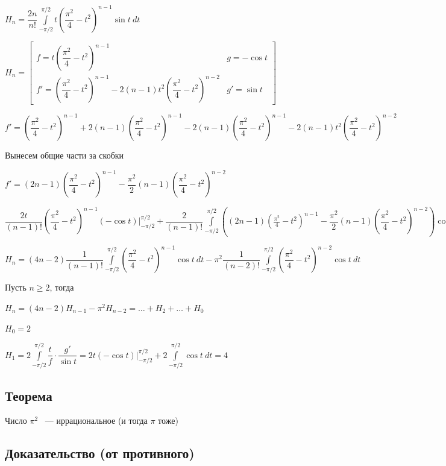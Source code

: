 \documentclass{article}
\begin{document}
			$H_n = \dfrac{2n}{n!} \int\limits^{\pi / 2}_{-\pi / 2} t \left(\dfrac{\pi^2}{4}-t^2 \right)^{n - 1} \sin t \ dt$
			
			$H_n = \begin{bmatrix} f = t \left(\dfrac{\pi^2}{4} - t^2\right)^{n - 1} & g = -\cos t \\ f' = \left(\dfrac{\pi^2}{4} - t^2\right)^{n - 1} - 2(n - 1)t^2\left(\dfrac{\pi^2}{4} - t^2\right)^{n - 2} & g' = \sin t \end{bmatrix}$
			
			$f' = \left(\dfrac{\pi^2}{4} - t^2 \right)^{n - 1} + 2 (n - 1) \left( \dfrac{\pi^2}{4} - t^2 \right)^{n - 1} - 2 (n - 1) \left( \dfrac{\pi^2}{4} - t^2 \right)^{n - 1} - 2(n - 1) t^2 \left(\dfrac{\pi^2}{4} - t^2 \right)^{n - 2}$
            
            Вынесем общие части за скобки
            
			$f' = (2n - 1)\left(\dfrac{\pi^2}{4} - t^2\right)^{n - 1} - \dfrac{\pi^2}{2}(n - 1)\left(\dfrac{\pi^2}{4}-t^2\right)^{n - 2}$
			
			$\dfrac{2t}{(n - 1)!} \left(\dfrac{\pi^2}{4} - t^2\right)^{n - 1} (-\cos t) \bigg|^{\pi / 2}_{-\pi / 2} + \dfrac{2}{(n - 1)!} \int\limits^{\pi / 2}_{-\pi / 2} \left( (2n - 1)\left(\frac{\pi^2}{4} - t^2\right)^{n - 1} - \dfrac{\pi^2}{2} (n - 1) \left(\dfrac{\pi^2}{4} - t^2\right)^{n - 2}\right) \cos t \ dt$
			
			$H_n = (4n - 2) \dfrac{1}{(n - 1)!} \int\limits^{\pi / 2}_{-\pi / 2} \left( \dfrac{\pi^2}{4} - t^2 \right)^{n - 1} \cos{t} \ dt - \pi^2 \dfrac{1}{(n - 2)!} \int\limits^{\pi / 2}_{- \pi / 2} \left( \dfrac{\pi^2}{4} - t^2 \right)^{n - 2} \cos{t} \ dt$
			
			Пусть $n \geq 2$, тогда
			
			$H_n = (4n - 2) H_{n - 1} - \pi^2 H_{n - 2} = \ldots + H_2 + \ldots + H_0$
			
			$H_0 = 2$
			
			$H_1 = 2 \int\limits^{\pi / 2}_{-\pi / 2} \dfrac{t}{f} \cdot \dfrac{g'}{\sin t} = 2t (- \cos t)\bigg|^{\pi / 2}_{-\pi / 2} + 2 \int\limits^{\pi / 2}_{-\pi / 2} \cos t \ dt = 4$
			
		\subsection{Теорема}
		
			Число $\pi^2$ ~--- иррациональное (и тогда $\pi$ тоже)
			
		\subsection{Доказательство (от противного)}
		
\end{document}
